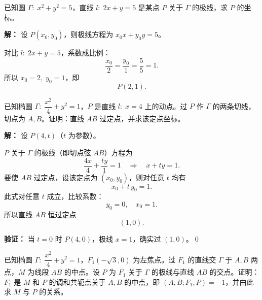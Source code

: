 \documentclass[12pt,a4paper]{ctexart}
\theoremstyle{definition}
\begin{document}
\vspace{6pt}

\begin{examplebox}
已知圆 $\Gamma:\;x^2+y^2=5$，直线 $l:\;2x+y=5$ 是某点 $P$ 关于 $\Gamma$ 的极线，求 $P$ 的坐标。
\end{examplebox}

\begin{solutionbox}
\textbf{解：}
设 $P(x_0,y_0)$，则极线方程为 $x_0 x+y_0 y=5$。

对比 $l:\;2x+y=5$，系数成比例：
\[
  \frac{x_0}{2}=\frac{y_0}{1}=\frac{5}{5}=1.
\]
所以 $x_0=2,\;y_0=1$，即
\[
  \boxed{P(2,1).}
\]
\end{solutionbox}

\vspace{6pt}

\begin{examplebox}
已知椭圆 $\Gamma:\;\dfrac{x^2}{4}+y^2=1$，$P$ 是直线 $l:\;x=4$ 上的动点。过 $P$ 作 $\Gamma$ 的两条切线，切点为 $A,B$。证明：直线 $AB$ 过定点，并求该定点坐标。
\end{examplebox}

\begin{solutionbox}
\textbf{解：}
设 $P(4,t)$（$t$ 为参数）。

$P$ 关于 $\Gamma$ 的极线（即切点弦 $AB$）方程为
\[
  \frac{4x}{4}+\frac{ty}{1}=1 \quad\Longrightarrow\quad x+ty=1.
\]
要使 $AB$ 过定点，设该定点为 $(x_0,y_0)$，则对任意 $t$ 均有
\[
  x_0+t\,y_0=1.
\]
此式对任意 $t$ 成立，比较系数：
\[
  y_0=0,\quad x_0=1.
\]
所以直线 $AB$ 恒过定点
\[
  \boxed{(1,0).}
\]

\textbf{验证：} 当 $t=0$ 时 $P(4,0)$，极线 $x=1$，确实过 $(1,0)$。\qed
\end{solutionbox}

\vspace{6pt}

\begin{examplebox}
已知椭圆 $\Gamma:\;\dfrac{x^2}{4}+y^2=1$，$F_1(-\sqrt{3},0)$ 为左焦点。过 $F_1$ 的直线交 $\Gamma$ 于 $A,B$ 两点，$M$ 为线段 $AB$ 的中点。设 $P$ 为 $F_1$ 关于 $\Gamma$ 的极线与直线 $AB$ 的交点。证明：$F_1$ 是 $M$ 和 $P$ 的调和共轭点关于 $A,B$ 的中点，即 $(A,B;F_1,P)=-1$，并由此求 $M$ 与 $P$ 的关系。
\end{examplebox}
\end{document}
